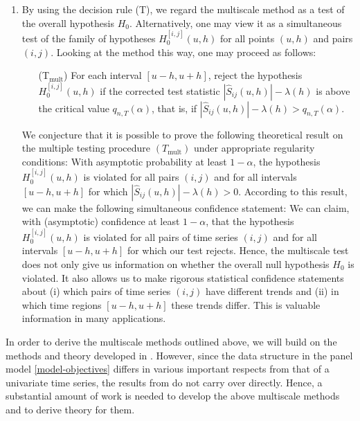 \documentclass[a4paper,12pt]{article}
\begin{document}
\begin{enumerate}[label=(\roman*),leftmargin=0.75cm]
\item By using the decision rule (T), we regard the multiscale method as a test of the overall hypothesis $H_0$. Alternatively, one may view it as a simultaneous test of the family of hypotheses $H_0^{[i,j]}(u,h)$ for all points $(u,h)$ and pairs $(i,j)$. Looking at the method this way, one may proceed as follows: 
\begin{itemize}[leftmargin=1.5cm]
\item[(T$_\text{mult}$)] 
For each interval $[u-h,u+h]$, reject the hypothesis $H_0^{[i,j]}(u,h)$ if the corrected test statistic $|\hat{S}_{ij}(u,h)| - \lambda(h)$ is above the critical value $q_{n,T}(\alpha)$, that is, if $|\hat{S}_{ij}(u,h)| - \lambda(h) > q_{n,T}(\alpha)$. 
\end{itemize}
We conjecture that it is possible to prove the following theoretical result on the multiple testing procedure $(T_{\text{mult}})$ under appropriate regularity conditions: With asymptotic probability at least $1-\alpha$, the hypothesis $H_0^{[i,j]}(u,h)$ is violated for all pairs $(i,j)$ and for all intervals $[u-h,u+h]$ for which $|\hat{S}_{ij}(u,h)| - \lambda(h) > 0$. According to this result, we can make the following simultaneous confidence statement: We can claim, with (asymptotic) confidence at least $1-\alpha$, that the hypothesis $H_0^{[i,j]}(u,h)$ is violated for all pairs of time series $(i,j)$ and for all intervals $[u-h,u+h]$ for which our test rejects. Hence, the multiscale test does not only give us information on whether the overall null hypothesis $H_0$ is violated. It also allows us to make rigorous statistical confidence statements about (i) which pairs of time series $(i,j)$ have different trends and (ii) in which time regions $[u-h,u+h]$ these trends differ. This is valuable information in many applications. 

\end{enumerate}
In order to derive the multiscale methods outlined above, we will build on the methods and theory developed in \cite{KhismatullinaVogt2018}. However, since the data structure in the panel model \eqref{model-objectives} differs in various important respects from that of a univariate time series, the results from \cite{KhismatullinaVogt2018} do not carry over directly. Hence, a substantial amount of work is needed to develop the above multiscale methods and to derive theory for them. 
\end{document}
